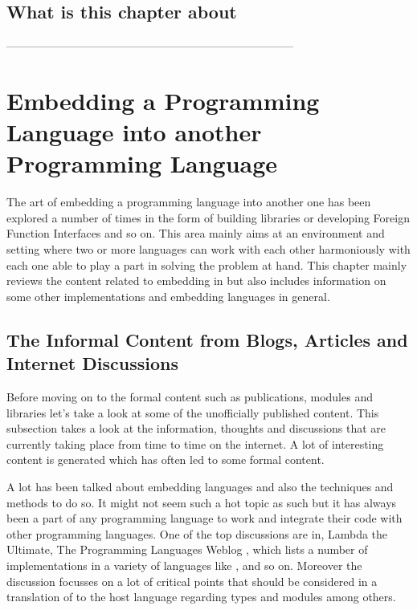 \documentclass[thesis-solanki.tex]{subfiles}
\begin{document}
\section{What is this chapter about}

-----------------------------------------------------------------------------

\chapter{Embedding a Programming Language into another Programming Language }\label{chap:embedding}

The art of embedding a programming language into another one has been explored a number of times in the form
of building libraries or developing Foreign Function Interfaces and so on. This area mainly aims at an environment
and setting where two or more languages can work with each other harmoniously with each one able to play a part
in solving the problem at hand. This chapter mainly reviews the content related to embedding  in
 but also includes information on some other implementations and embedding languages in
general.


\section{The Informal Content from Blogs, Articles and Internet Discussions}

Before moving on to the formal content such as publications, modules and libraries let's take a look at some of the
unofficially published content.
This subsection takes a look at the information, thoughts and discussions that are currently taking place from time
to time on the internet.
A lot of interesting content is generated which has often led to some formal content.

A lot has been talked about embedding languages and also the techniques and methods to do so.
It might not seem such a hot topic as such but it has always been a part of any programming language to work and
integrate their code with other programming languages.
One of the top discussions are in, Lambda the Ultimate, The Programming Languages Weblog
\cite{website:lambda-the-ultimate},  which lists a number of  implementations in a variety of
languages like ,  \cite{racklog} and so on.
Moreover the discussion focusses on a lot of critical points that should be considered in a translation of
 to the host language regarding types and modules among others.
\end{document}
